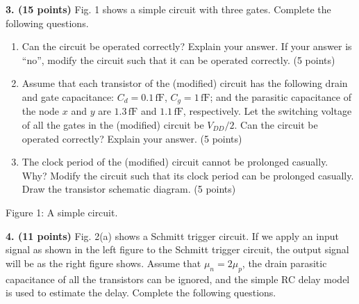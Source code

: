 \documentclass[10pt]{article}
\newcommand{\mos}[4]{\begin{scope}[shift={(#1,#2)}]
\draw (0,.24)--(0,-.24);\draw (0,.20)--(.25,.20)--(.25,.5);
\draw (0,-.20)--(.25,-.20)--(.25,-.5);\draw (-.16,.23)--(-.16,-.23);
\ifnum#4=1\draw (-.26,0) circle (.06);\draw (-.75,0)--(-.32,0);\else\draw (-.75,0)--(-.16,0);\fi
\node[anchor=east,font=\scriptsize] at (-.76,0) {$#3$};\end{scope}}
\newcommand{\ground}[2]{\draw (#1,#2)--(#1,{#2-.12});\draw ({#1-.17},{#2-.12})--({#1+.17},{#2-.12});\draw ({#1-.11},{#2-.20})--({#1+.11},{#2-.20});}
\newcommand{\rail}[3]{\draw (#1,#2)--(#1,{#2+.14});\node[above,font=\scriptsize] at (#1,{#2+.14}) {$#3$};}
\begin{document}
\textbf{3. (15 points)} Fig. 1 shows a simple circuit with three gates. Complete the following questions.
\begin{enumerate}[label=(\alph*),leftmargin=7mm,itemsep=4pt]
\item Can the circuit be operated correctly? Explain your answer. If your answer is ``no'', modify the circuit such that it can be operated correctly. (5 points)
\item Assume that each transistor of the (modified) circuit has the following drain and gate capacitance: $C_d=0.1\,\mathrm{fF}$, $C_g=1\,\mathrm{fF}$; and the parasitic capacitance of the node $x$ and $y$ are $1.3\,\mathrm{fF}$ and $1.1\,\mathrm{fF}$, respectively. Let the switching voltage of all the gates in the (modified) circuit be $V_{DD}/2$. Can the circuit be operated correctly? Explain your answer. (5 points)
\item The clock period of the (modified) circuit cannot be prolonged casually. Why? Modify the circuit such that its clock period can be prolonged casually. Draw the transistor schematic diagram. (5 points)
\end{enumerate}
\begin{center}\end{center}\begin{center}\small Figure 1: A simple circuit.\end{center}
\newpage
\textbf{4. (11 points)} Fig. 2(a) shows a Schmitt trigger circuit. If we apply an input signal as shown in the left figure to the Schmitt trigger circuit, the output signal will be as the right figure shows. Assume that $\mu_n=2\mu_p$, the drain parasitic capacitance of all the transistors can be ignored, and the simple RC delay model is used to estimate the delay. Complete the following questions.
\end{document}
